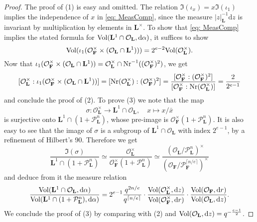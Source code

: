 \documentclass[A4]{amsart}
\numberwithin{equation}{section} \everymath{\displaystyle}
\newcommand{\Nr}{{\rm Nr}}
\newcommand{\ud}{\mathrm{d}}
\newcommand{\F}{\mathbf{F}}
\newcommand{\bL}{\mathbf{L}}
\newcommand{\vO}{\mathcal{O}}
\newcommand{\vP}{\mathcal{P}}
\newcommand{\norm}[1][\cdot]{\lvert #1 \rvert}
\newcommand{\Vol}{{\rm Vol}}
\begin{document}
\begin{proof}
	The proof of (1) is easy and omitted. The relation $\Im(\iota_x) = x \Im(\iota_1)$ implies the independence of $x$ in \eqref{eq: MeasComp}, since the measure $\norm[z]_{\bL}^{-1} \ud z$ is invariant by multiplication by elements in $\bL^{\times}$. To show that \eqref{eq: MeasComp} implies the stated formula for $\Vol(\bL^1 \cap \vO_{\bL}, \ud \alpha)$, it suffices to show 
	$$ \Vol(\iota_1(\vO_{\F}^{\times} \times (\vO_{\bL} \cap \bL^1))) = 2^{e-2} \Vol(\vO_{\bL}^{\times}). $$
	Now that $\iota_1(\vO_{\F}^{\times} \times (\vO_{\bL} \cap \bL^1)) = \vO_{\bL}^{\times} \cap \Nr^{-1}((\vO_{\F}^{\times})^2)$, we get
	$$ [\vO_{\bL}^{\times} : \iota_1(\vO_{\F}^{\times} \times (\vO_{\bL} \cap \bL^1))] = [\Nr(\vO_{\bL}^{\times}) : (\vO_{\F}^{\times})^2] = \frac{[\vO_{\F}^{\times} : (\vO_{\F}^{\times})^2]}{[\vO_{\F}^{\times} : \Nr(\vO_{\bL}^{\times})]} = \frac{2}{2^{e-1}} $$
	and conclude the proof of (2). To prove (3) we note that the map
	$$ \sigma: \vO_{\bL}^{\times} \to \bL^1 \cap \vO_{\bL}, \quad x \mapsto x / \bar{x} $$
	is surjective onto $\bL^1 \cap (1+\vP_{\bL}^n)$, whose pre-image is $\vO_{\F}^{\times}(1+\vP_{\bL}^n)$. It is also easy to see that the image of $\sigma$ is a subgroup of $\bL^1 \cap \vO_{\bL}$ with index $2^{e-1}$, by a refinement of Hilbert's 90. Therefore we get
	$$ \frac{\Im(\sigma)}{\bL^1 \cap (1+\vP_{\bL}^n)} \simeq \frac{\vO_{\bL}^{\times}}{\vO_{\F}^{\times}(1+\vP_{\bL}^n)} \simeq \frac{(\vO_{\bL}/\vP_{\bL}^n)^{\times}}{(\vO_{\F}/\vP_{\F}^{\lceil n/e \rceil})^{\times}} $$
	and deduce from it the measure relation
	$$ \frac{\Vol(\bL^1 \cap \vO_{\bL}, \ud \alpha)}{\Vol(\bL^1 \cap (1+\vP_{\bL}^n), \ud \alpha)} = 2^{e-1} \frac{q^{2n/e}}{q^{\lceil n/e \rceil}} \cdot \frac{\Vol(\vO_{\bL}^{\times}, \ud z)}{\Vol(\vO_{\F}^{\times}, \ud r)} \cdot \frac{\Vol(\vO_{\F}, \ud r)}{\Vol(\vO_{\bL}, \ud z)}. $$
	We conclude the proof of (3) by comparing with (2) and $\Vol(\vO_{\bL}, \ud z) = q^{-\frac{e-1}{2}}$.
\end{proof}
	
\end{document}
